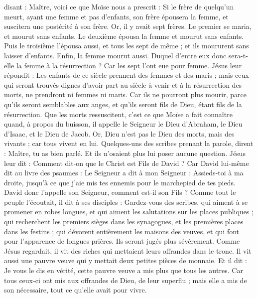 \begin{multicols}{2}
disant : Maître, voici ce que Moïse nous a prescrit : Si le frère de quelqu'un meurt, ayant une femme et pas d’enfants, son frère épousera la femme, et suscitera une postérité à son frère.
Or, il y avait sept frères. Le premier se maria, et mourut sans enfants.
Le deuxième épousa la femme et mourut sans enfants.
Puis le troisième l’épousa aussi, et tous les sept de même ; et ils moururent sans laisser d’enfants.
Enfin, la femme mourut aussi.
Duquel d’entre eux donc sera-t-elle la femme à la résurrection ? Car les sept l'ont eue pour femme.
Jésus leur répondit : Les enfants de ce siècle prennent des femmes et des maris ;
mais ceux qui seront trouvés dignes d’avoir part au siècle à venir et à la résurrection des morts, ne prendront ni femmes ni maris.
Car ils ne pourront plus mourir, parce qu'ils seront semblables aux anges, et qu'ils seront fils de Dieu, étant fils de la résurrection.
Que les morts ressuscitent, c’est ce que Moïse a fait connaître quand, à propos du buisson, il appelle le Seigneur le Dieu d'Abraham, le Dieu d'Isaac, et le Dieu de Jacob.
Or, Dieu n'est pas le Dieu des morts, mais des vivants ; car tous vivent en lui.
Quelques-uns des scribes prenant la parole, dirent : Maître, tu as bien parlé.
Et ils n’osaient plus lui poser aucune question.
Jésus leur dit : Comment dit-on que le Christ est Fils de David ?
Car David lui-même dit au livre des psaumes : Le Seigneur a dit à mon Seigneur : Assieds-toi à ma droite,
jusqu’à ce que j’aie mis tes ennemis pour le marchepied de tes pieds.
David donc l'appelle son Seigneur, comment est-il son Fils ?
Comme tout le peuple l’écoutait, il dit à ses disciples :
Gardez-vous des scribes, qui aiment à se promener en robes longues, et qui aiment les salutations sur les places publiques ; qui recherchent les premiers sièges dans les synagogues, et les premières places dans les festins ;
qui dévorent entièrement les maisons des veuves, et qui font pour l’apparence de longues prières. Ils seront jugés plus sévèrement.
\VerseOne{}Comme Jésus regardait, il vit des riches qui mettaient leurs offrandes dans le tronc.
Il vit aussi une pauvre veuve qui y mettait deux petites pièces de monnaie.
Et il dit : Je vous le dis en vérité, cette pauvre veuve a mis plus que tous les autres.
Car tous ceux-ci ont mis aux offrandes de Dieu, de leur superflu ; mais elle a mis de son nécessaire, tout ce qu'elle avait pour vivre.

\end{multicols}
